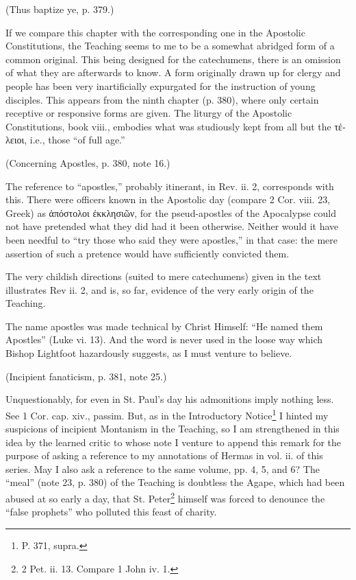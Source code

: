 (Thus baptize ye, p. 379.)

If we compare this chapter with the corresponding one in the Apostolic Constitutions, the Teaching seems to me to be a somewhat abridged form of a common original. This being designed for the catechumens, there is an omission of what they are afterwards to know. A form originally drawn up for clergy and people has been very inartificially expurgated for the instruction of young disciples. This appears from the ninth chapter (p. 380), where only certain receptive or responsive forms are given. The liturgy of the Apostolic Constitutions, book viii., embodies what was studiously kept from all but the \textgreek{τέλειοι}, i.e., those “of full age.”

(Concerning Apostles, p. 380, note 16.)

The reference to “apostles,” probably itinerant, in Rev. ii. 2, corresponds with this. There were officers known in the Apostolic day (compare 2 Cor. viii. 23, Greek) as \textgreek{ἀπόστολοι} \textgreek{ἐκκλησιῶν}, for the pseud-apostles of the Apocalypse could not have pretended what they did had it been otherwise. Neither would it have been needful to “try those who said they were apostles,” in that case: the mere assertion of such a pretence would have sufficiently convicted them.

The very childish directions (suited to mere catechumens) given in the text illustrates Rev ii. 2, and is, so far, evidence of the very early origin of the Teaching.

The name apostles was made technical by Christ Himself: “He named them Apostles” (Luke vi. 13). And the word is never used in the loose way which Bishop Lightfoot hazardously suggests, as I must venture to believe.

(Incipient fanaticism, p. 381, note 25.)

Unquestionably, for even in St. Paul’s day his admonitions imply nothing less. See 1 Cor. cap. xiv., passim. But, as in the Introductory Notice\footnote{\par  P. 371, supra.} I hinted my suspicions of incipient Montanism in the Teaching, so I am strengthened in this idea by the learned critic to whose note I venture to append this remark for the purpose of asking a reference to my annotations of Hermas in vol. ii. of this series. May I also ask a reference to the same volume, pp. 4, 5, and 6? The “meal” (note 23, p. 380) of the Teaching is doubtless the Agape, which had been abused at so early a day, that St. Peter\footnote{\par 2 Pet. ii. 13. Compare 1 John iv. 1.} himself was forced to denounce the “false prophets” who polluted this feast of charity.
